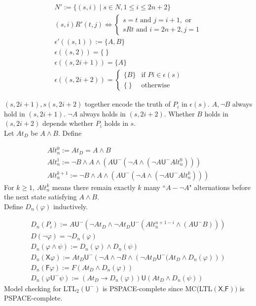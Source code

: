\documentclass[12pt]{article}
\begin{document}
$$\begin{array}{l}
N':=\{(s,i)\mid s\in N, 1\leq i\leq 2n+2\}\\

(s,i)R'(t,j) \Longleftrightarrow\left\{\begin{array}{l}
s=t \mbox{ and } j=i+1, \mbox{ or }\\
sRt \mbox{ and } i=2n+2, j=1
\end{array}\right.\\
\epsilon'((s,1)):=\{A,B\}\\
\epsilon((s,2))=\{\ \}\\
\epsilon((s,2i+1))=\{A\}\\
\epsilon((s,2i+2))=\left\{\begin{array}{ll}
\{B\} & \mbox{if } Pi\in \epsilon(s)\\
\{\ \} & \mbox{otherwise}
\end{array}\right.
\end{array}
$$

$(s,2i+1), s(s,2i+2)$ together encode the truth of $P_i$ in $\epsilon(s)$. 
%
$A, \neg B$ always hold in $(s,2i+1)$. $\neg A$ always holds in $(s,2i+2)$. Whether $B$ holds in $(s,2i+2)$ depends whether $P_i$ holds in $s$. \\


Let $At_D$ be $A\wedge B$. Define 

$$\begin{array}{l}
Alt^0_n:=At_D=A\wedge B\\
Alt^1_n:=\neg B\wedge A\wedge\left(A\textsf{U}^-\left(\neg A\wedge\left(\neg A\textsf{U}^-Alt_n^0\right)\right)\right)\\
Alt^{k+1}_n:=\neg B\wedge A\wedge\left(A\textsf{U}^-\left(\neg A\wedge\left(\neg A\textsf{U}^-Alt_n^k\right)\right)\right)
\end{array}$$
%
For $k\geq 1$, $Alt^k_n$ means there remain exactly $k$ many ``$A-\neg A$" alternations before the next state satisfying $A\wedge B$.\\

Define $D_n(\varphi)$ inductively. 

$$\begin{array}{l}
D_n(P_i):=A\textsf{U}^-\left(\neg At_D\wedge \neg At_D\textsf{U}^-\left(Alt^{n+1-i}_n\wedge (A\textsf{U}^-B)\right)\right)\\
D(\neg \varphi)=\neg D_n(\varphi)\\
D_n(\varphi\wedge\psi):=D_n(\varphi)\wedge D_n(\psi)\\
D_n(\textsf{X}\varphi):=At_D\textsf{U}^-\left(\neg A\wedge\neg B\wedge\left(
\neg At_D\textsf{U}^-(At_D\wedge D_n(\varphi)\right)\right)\\
D_n(\textsf{F}\varphi):=F(At_D\wedge D_n(\varphi))\\
D_n(\varphi\textsf{U}^-\psi):=(At_D\rightarrow D_n(\varphi))\textsf{U}(At_D\wedge D_n(\psi))
\end{array}$$
%
\color{red} Model checking for LTL$_2(\textsf{U}^-)$ is PSPACE-complete since MC(LTL$(\textsf{X,F}))$ is PSPACE-complete. 
\color{black}
\end{document}
